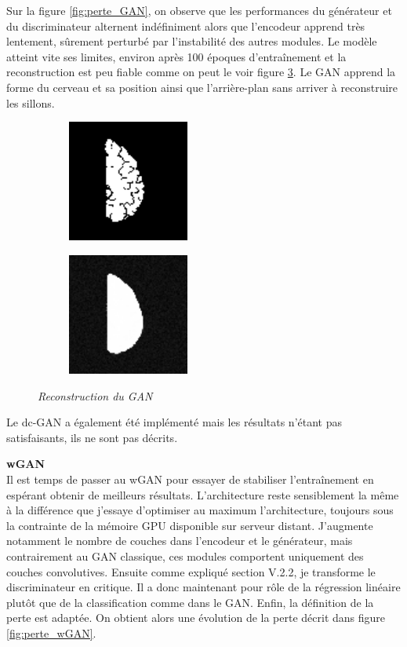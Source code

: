 \documentclass[12pt, oneside, a4paper, titlepage]{article}
\begin{document}
Sur la figure \ref{fig:perte_GAN}, on observe que les performances du générateur et du discriminateur alternent indéfiniment alors que l'encodeur apprend très lentement, sûrement perturbé par l'instabilité des autres modules. Le modèle atteint vite ses limites, environ après 100 époques d'entraînement et la reconstruction est peu fiable comme on peut le voir figure \ref{fig:reco_GAN}. Le GAN apprend la forme du cerveau et sa position ainsi que l'arrière-plan sans arriver à reconstruire les sillons.

\begin{figure}[H]
\centering
\begin{subfigure}{.2\textwidth}
    \includegraphics[width=4cm, height=4cm]{data1_40.png}
  \label{fig:sub1}
\end{subfigure}%
\begin{subfigure}{.2\textwidth}
  \includegraphics[width=4cm, height=4cm]{target1_40.png}
  \label{fig:sub2}
\end{subfigure}
\caption{\textit{Reconstruction du GAN}}
\label{fig:reco_GAN}
\end{figure}

Le dc-GAN a également été implémenté mais les résultats n'étant pas satisfaisants, ils ne sont pas décrits.
\vspace{0.5cm}

\textbf{wGAN}\\

Il est temps de passer au wGAN pour essayer de stabiliser l'entraînement en espérant obtenir de meilleurs résultats. L'architecture reste sensiblement la même à la différence que j'essaye d'optimiser au maximum l'architecture, toujours sous la contrainte de la mémoire GPU disponible sur serveur distant. J'augmente notamment le nombre de couches dans l'encodeur et le générateur, mais contrairement au GAN classique, ces modules comportent uniquement des couches convolutives. Ensuite comme expliqué section V.2.2, je transforme le discriminateur en critique. Il a donc maintenant pour rôle de la régression linéaire plutôt que de la classification comme dans le GAN. Enfin, la définition de la perte est adaptée.
On obtient alors une évolution de la perte décrit dans figure \ref{fig:perte_wGAN}.
\end{document}
